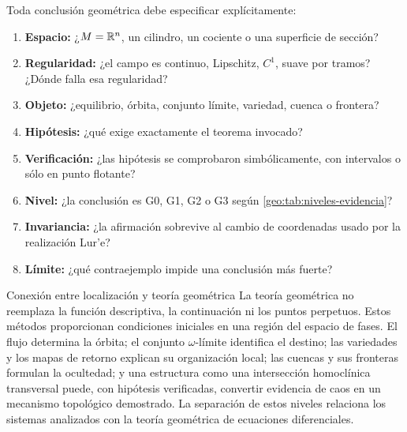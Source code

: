 Toda conclusión geométrica debe especificar explícitamente:

\begin{enumerate}
  \item \textbf{Espacio:} ¿\(M=\mathbb{R}^n\), un cilindro, un cociente o una
        superficie de sección?
  \item \textbf{Regularidad:} ¿el campo es continuo, Lipschitz, \(C^1\), suave
        por tramos? ¿Dónde falla esa regularidad?
  \item \textbf{Objeto:} ¿equilibrio, órbita, conjunto límite, variedad,
        cuenca o frontera?
  \item \textbf{Hipótesis:} ¿qué exige exactamente el teorema invocado?
  \item \textbf{Verificación:} ¿las hipótesis se comprobaron simbólicamente,
        con intervalos o sólo en punto flotante?
  \item \textbf{Nivel:} ¿la conclusión es G0, G1, G2 o G3 según
        \cref{geo:tab:niveles-evidencia}?
  \item \textbf{Invariancia:} ¿la afirmación sobrevive al cambio de
        coordenadas usado por la realización Lur'e?
  \item \textbf{Límite:} ¿qué contraejemplo impide una conclusión más fuerte?
\end{enumerate}

\begin{hallazgo}{Conexión entre localización y teoría geométrica}
La teoría geométrica no reemplaza la función descriptiva, la continuación ni
los puntos perpetuos. Estos métodos proporcionan condiciones iniciales en una
región del espacio de fases. El flujo determina la órbita; el conjunto
\(\omega\)-límite identifica el destino; las variedades y los mapas de retorno
explican su organización local; las cuencas y sus fronteras formulan la
ocultedad; y una estructura como una intersección homoclínica transversal
puede, con hipótesis verificadas, convertir evidencia de caos en un mecanismo
topológico demostrado. La separación de estos niveles relaciona los sistemas
analizados con la teoría geométrica de ecuaciones diferenciales.
\end{hallazgo}
\fi
\fi
